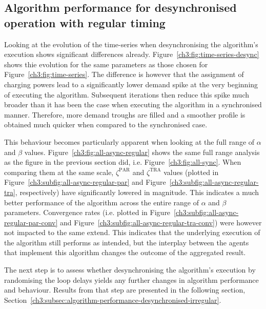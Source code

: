 \subsection{Algorithm performance for desynchronised operation with regular timing}
\label{ch3:subsec:algorithm-performance-desynchronised-regular}



Looking at the evolution of the time-series when desynchronising the algorithm's execution shows significant differences already.
Figure~\ref{ch3:fig:time-series-desync} shows thie evolution for the same parameters as those chosen for Figure~\ref{ch3:fig:time-series}.
The difference is however that the assignment of charging powers lead to a significantly lower demand spike at the very beginning of executing the algorithm.
Subsequent iterations then reduce this spike much broader than it has been the case when executing the algorithm in a synchronised manner.
Therefore, more demand troughs are filled and a smoother profile is obtained much quicker when compared to the synchronised case.



This behaviour becomes particularly apparent when looking at the full range of $\alpha$ and $\beta$ values.
Figure~\ref{ch3:fig:all-async-regular} shows the same full range analysis as the figure in the previous section did, i.e. Figure~\ref{ch3:fig:all-sync}.
When comparing them at the same scale, $\zeta^\text{PAR}$ and $\zeta^\text{TRA}$ values (plotted in Figure~\ref{ch3:subfig:all-async-regular-par} and Figure~\ref{ch3:subfig:all-async-regular-tra}, respectively) have significantly lowered in magnitude.
This indicates a much better performance of the algorithm across the entire range of $\alpha$ and $\beta$ parameters.
Convergence rates (i.e. plotted in Figure~\ref{ch3:subfig:all-async-regular-par-conv} and Figure~\ref{ch3:subfig:all-async-regular-tra-conv}) were however not impacted to the same extend.
This indicates that the underlying execution of the algorithm still performs as intended, but the interplay between the agents that implement this algorithm changes the outcome of the aggregated result.

The next step is to assess whether desynchronising the algorithm's execution by randomising the loop delays yields any further changes in algorithm performance and behaviour.
Results from that step are presented in the following section, Section~\ref{ch3:subsec:algorithm-performance-desynchronised-irregular}.

